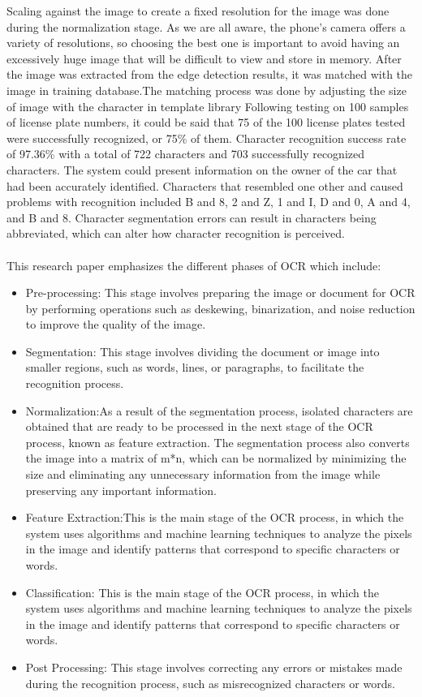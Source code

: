 Scaling against the image to create a fixed resolution for the image was done during the normalization stage. As we are all aware, the phone's camera offers a variety of resolutions, so choosing the best one is important to avoid having an excessively huge image that will be difficult to view and store in memory. After the image was extracted from the edge detection results, it was matched with the image in training database.The matching process was done by adjusting the size of image with the character in template library
Following testing on 100 samples of license plate numbers, it could be said that 75 of the 100 license plates tested were successfully recognized, or 75\% of them. Character recognition success rate of 97.36\% with a total of 722 characters and 703 successfully recognized characters. The system could present information on the owner of the car that had been accurately identified. Characters that resembled one other and caused problems with recognition included B and 8, 2 and Z, 1 and I, D and 0, A and 4, and B and 8. Character segmentation errors can result in characters being abbreviated, which can alter how character recognition is perceived.
\\
\\
\big[6\big]This research paper emphasizes the different phases of OCR which include:
	\begin{itemize}
		\item Pre-processing: This stage involves preparing the image or document for OCR by performing operations such as deskewing, binarization, and noise reduction to improve the quality of the image. 
	\item Segmentation: This stage involves dividing the document or image into smaller regions, such as words, lines, or paragraphs, to facilitate the recognition process.
	\item Normalization:As a result of the segmentation process, isolated characters are obtained that are ready to be processed in the next stage of the OCR process, known as feature extraction. The segmentation process also converts the image into a matrix of m*n, which can be normalized by minimizing the size and eliminating any unnecessary information from the image while preserving any important information.
	\item Feature Extraction:This is the main stage of the OCR process, in which the system uses algorithms and machine learning techniques to analyze the pixels in the image and identify patterns that correspond to specific characters or words.
	\item Classification: This is the main stage of the OCR process, in which the system uses algorithms and machine learning techniques to analyze the pixels in the image and identify patterns that correspond to specific characters or words.
	\item Post Processing: This stage involves correcting any errors or mistakes made during the recognition process, such as misrecognized characters or words.
\end{itemize}
